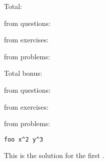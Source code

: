 \documentclass{article}
\begin{document}
Total: \printtotalpoints \par
from questions:  \par
from exercises:  \par
from problems:  \par \bigskip

Total bonus: \printtotalbonus \par
from questions:  \par
from exercises:  \par
from problems:  \par


\begin{question}[points=4,bonus-points=1,topic=geometry,tags={geometry,triangles},grade=7]
  \lipsum[1]
\begin{verbatim}
foo x^2 y^3
\end{verbatim}
\end{question}
\begin{solution}[print]
  This is the solution for the first \ExerciseType.
\end{solution}


\begin{question}[subtitle=Foo,points=5,topic=analysis,tags={analysis,functions},grade=11]
  \lipsum[2]
\end{question}


\begin{problem}
  \lipsum[3]
\end{problem}


\begin{exercise}
  \lipsum[4]
\end{exercise}


\begin{problem}[points=2]
  \lipsum[3]
\end{problem}

\begin{problem}[points=1]
  \lipsum[3]
\end{problem}

\begin{question}
  \lipsum[5]
\end{question}

\begin{question}[print=false]
  \lipsum[5]
\end{question}
\end{document}
